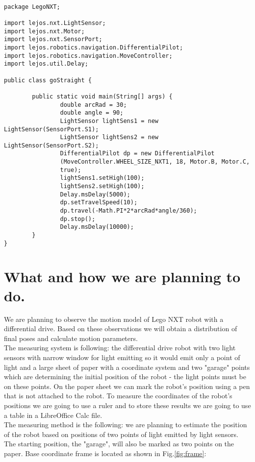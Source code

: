 \documentclass[a4paper, 12pt]{article}
\begin{document}
\begin{lstlisting}

package LegoNXT;

import lejos.nxt.LightSensor;
import lejos.nxt.Motor;
import lejos.nxt.SensorPort;
import lejos.robotics.navigation.DifferentialPilot;
import lejos.robotics.navigation.MoveController;
import lejos.util.Delay;

public class goStraight {

        public static void main(String[] args) {
                double arcRad = 30;
                double angle = 90;
                LightSensor lightSens1 = new LightSensor(SensorPort.S1);
                LightSensor lightSens2 = new LightSensor(SensorPort.S2);
                DifferentialPilot dp = new DifferentialPilot
                (MoveController.WHEEL_SIZE_NXT1, 18, Motor.B, Motor.C,
                true);
                lightSens1.setHigh(100);
                lightSens2.setHigh(100);
                Delay.msDelay(5000);
                dp.setTravelSpeed(10);
                dp.travel(-Math.PI*2*arcRad*angle/360);
                dp.stop();
                Delay.msDelay(10000);
        }
}

\end{lstlisting}
\section{What and how we are planning to do.}
We are planning to observe the motion model of Lego NXT robot with a differential drive. Based on these observations we will obtain a distribution of final poses and calculate motion parameters.\\
The measuring system is following: the differential drive robot with two light sensors with narrow window for light emitting so it would emit only a point of light and a large sheet of paper with a coordinate system and two "garage" points which are determining the initial position of the robot - the light points must be on these points. On the paper sheet we can mark the robot's position using a pen that is not attached to the robot. To measure the coordinates of the robot's positions we are going to use a ruler and to store these results we are going to use a table in a LibreOffice Calc file.\\
The measuring method is the following: we are planning to estimate the position of the robot based on positions of two points of light emitted by light sensors. The starting position, the "garage", will also be marked as two points on the paper. 
Base coordinate frame is located as shown in Fig.\ref{fig:frame}:
\end{document}
